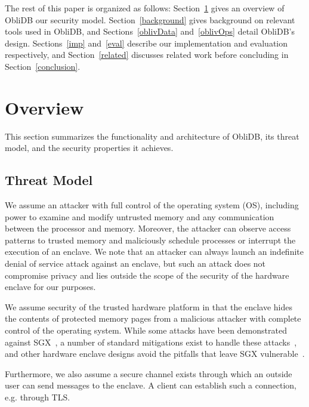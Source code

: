 \documentclass[letterpaper,twocolumn,10pt]{article}
\newcommand{\ignore}[1]{}
\def\name/{ObliDB}
\begin{document}
The rest of this paper is organized as follows: Section~\ref{model} gives an overview of \name/ our security model. Section~\ref{background} gives background on relevant tools used in \name/, and Sections~\ref{oblivData} and~\ref{oblivOps} detail \name/'s design. Sections~\ref{imp} and~\ref{eval} describe our implementation and evaluation respectively, and Section~\ref{related} discusses related work before concluding in Section~\ref{conclusion}.

\section{Overview}\label{model}
This section summarizes the functionality and architecture of \name/, its threat model, and the security properties it achieves.

\subsection{Threat Model}
We assume an attacker with full control of the operating system (OS), including power to examine and modify untrusted memory and any communication between the processor and memory. Moreover, the attacker can observe access patterns to trusted memory and maliciously schedule processes or interrupt the execution of an enclave. We note that an attacker can always launch an indefinite denial of service attack against an enclave, but such an attack does not compromise privacy and lies outside the scope of the security of the hardware enclave for our purposes.

We assume security of the trusted hardware platform in that the enclave hides the contents of protected memory pages from a malicious attacker with complete control of the operating system. While some attacks have been demonstrated against SGX~\cite{LSG+16,XCP15}, a number of standard mitigations exist to handle these attacks~\cite{SCNS16,RLT15,SLK+17,SLKP17}, and other hardware enclave designs avoid the pitfalls that leave SGX vulnerable~\cite{CLD16, LHM+15, MLS+13}.

Furthermore, we also assume a secure channel exists through which an outside user can send messages to the enclave. A client can establish such a connection, e.g. through TLS. \ignore{ (this is fairly straightforward with SGX), but we did not implement this for our tests, as it is not directly related to the functionality provided by \name/.}
\end{document}
